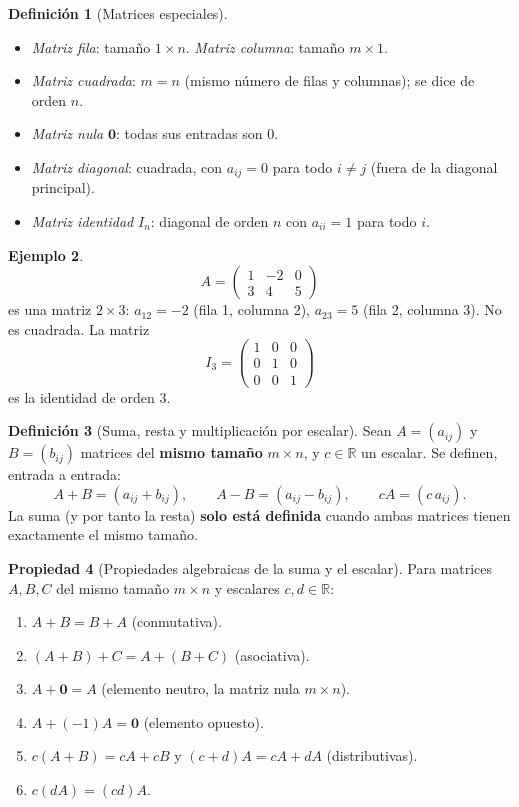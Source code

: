 \documentclass[11pt,letterpaper]{article}
\theoremstyle{definition}
\newtheorem{definicion}{Definición}[section]
\newtheorem{ejemplo}[definicion]{Ejemplo}
\newtheorem{propiedad}[definicion]{Propiedad}
\theoremstyle{plain}
\newcommand{\R}{\mathbb{R}}
\newcommand{\vv}[1]{\mathbf{#1}}
\begin{document}
\begin{definicion}[Matrices especiales]
\begin{itemize}
  \item \emph{Matriz fila}: tamaño $1\times n$. \emph{Matriz columna}: tamaño $m\times 1$.
  \item \emph{Matriz cuadrada}: $m=n$ (mismo número de filas y columnas); se dice de orden $n$.
  \item \emph{Matriz nula} $\vv{0}$: todas sus entradas son $0$.
  \item \emph{Matriz diagonal}: cuadrada, con $a_{ij}=0$ para todo $i\neq j$ (fuera de la
        diagonal principal).
  \item \emph{Matriz identidad} $I_n$: diagonal de orden $n$ con $a_{ii}=1$ para todo $i$.
\end{itemize}
\end{definicion}

\begin{ejemplo}
\[
  A = \begin{pmatrix} 1 & -2 & 0 \\ 3 & 4 & 5 \end{pmatrix}
\]
es una matriz $2\times 3$: $a_{12}=-2$ (fila 1, columna 2), $a_{23}=5$ (fila 2, columna 3). No es
cuadrada. La matriz
\[
  I_3 = \begin{pmatrix} 1&0&0\\0&1&0\\0&0&1 \end{pmatrix}
\]
es la identidad de orden 3.
\end{ejemplo}

\begin{definicion}[Suma, resta y multiplicación por escalar]
Sean $A=(a_{ij})$ y $B=(b_{ij})$ matrices del \textbf{mismo tamaño} $m\times n$, y $c\in\R$ un
escalar. Se definen, entrada a entrada:
\[
  A+B = (a_{ij}+b_{ij}), \qquad A-B = (a_{ij}-b_{ij}), \qquad cA = (c\,a_{ij}).
\]
La suma (y por tanto la resta) \textbf{solo está definida} cuando ambas matrices tienen exactamente
el mismo tamaño.
\end{definicion}

\begin{propiedad}[Propiedades algebraicas de la suma y el escalar]
Para matrices $A,B,C$ del mismo tamaño $m\times n$ y escalares $c,d\in\R$:
\begin{enumerate}[label=(\roman*)]
  \item $A+B=B+A$ (conmutativa).
  \item $(A+B)+C = A+(B+C)$ (asociativa).
  \item $A+\vv{0}=A$ (elemento neutro, la matriz nula $m\times n$).
  \item $A+(-1)A=\vv{0}$ (elemento opuesto).
  \item $c(A+B)=cA+cB$ y $(c+d)A=cA+dA$ (distributivas).
  \item $c(dA)=(cd)A$.
\end{enumerate}
\end{propiedad}
\end{document}
